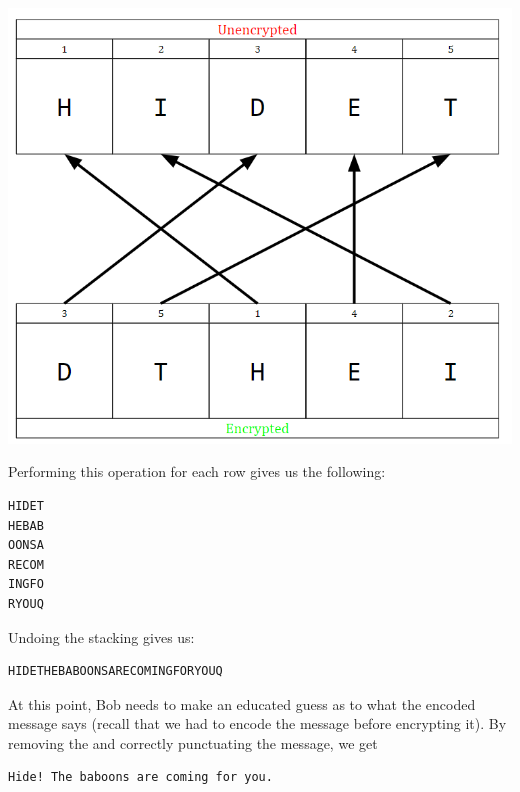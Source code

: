 \documentclass[letterpaper]{article}
\begin{document}
\begin{mdframed}
    \begin{center}
        \includegraphics[scale=0.7]{../assets/ex2_hidet.png}
    \end{center}
    Performing this operation for each row gives us the following: 
    \begin{mdframed}
        \begin{verbatim}
HIDET
HEBAB
OONSA
RECOM
INGFO
RYOUQ\end{verbatim}
    \end{mdframed}
    Undoing the stacking gives us:
    \begin{mdframed}
        \begin{verbatim}
HIDETHEBABOONSARECOMINGFORYOUQ\end{verbatim}
    \end{mdframed}
    At this point, Bob needs to make an educated guess as to what the encoded message says (recall that we had to encode the message before encrypting it). By removing the  and correctly punctuating the message, we get 
    \begin{mdframed}
        \begin{verbatim}
Hide! The baboons are coming for you.\end{verbatim}
    \end{mdframed}
\end{mdframed}
\end{document}
